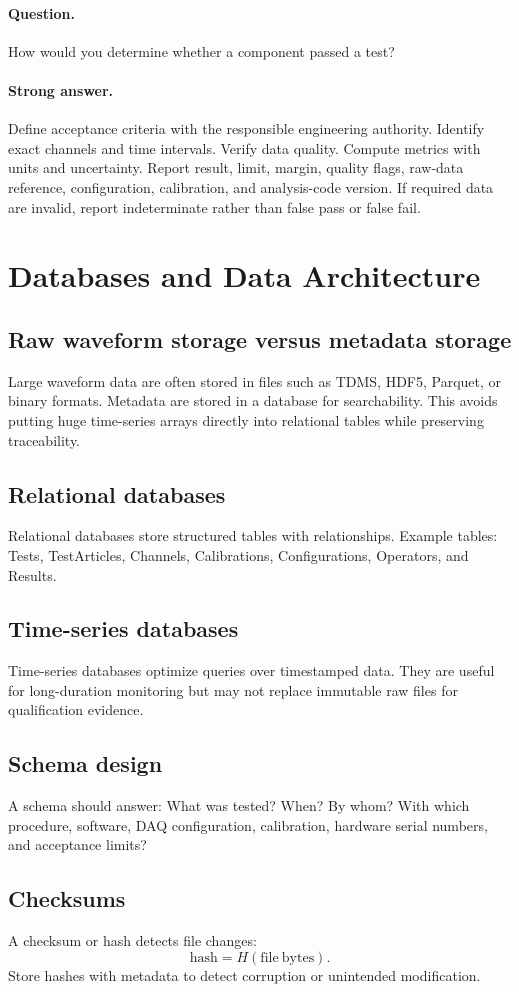 \documentclass[11pt]{article}
\newcommand{\question}[1]{\paragraph{Question.} #1}
\newcommand{\stronganswer}[1]{\paragraph{Strong answer.} #1}
\begin{document}
\question{How would you determine whether a component passed a test?}
\stronganswer{Define acceptance criteria with the responsible engineering
authority. Identify exact channels and time intervals. Verify data quality.
Compute metrics with units and uncertainty. Report result, limit, margin,
quality flags, raw-data reference, configuration, calibration, and analysis-code
version. If required data are invalid, report indeterminate rather than false
pass or false fail.}

\section{Databases and Data Architecture}

\subsection{Raw waveform storage versus metadata storage}
Large waveform data are often stored in files such as TDMS, HDF5, Parquet, or
binary formats. Metadata are stored in a database for searchability. This avoids
putting huge time-series arrays directly into relational tables while preserving
traceability.

\subsection{Relational databases}
Relational databases store structured tables with relationships. Example tables:
Tests, TestArticles, Channels, Calibrations, Configurations, Operators, and
Results.

\subsection{Time-series databases}
Time-series databases optimize queries over timestamped data. They are useful
for long-duration monitoring but may not replace immutable raw files for
qualification evidence.

\subsection{Schema design}
A schema should answer: What was tested? When? By whom? With which procedure,
software, DAQ configuration, calibration, hardware serial numbers, and
acceptance limits?

\subsection{Checksums}
A checksum or hash detects file changes:
\[
\mathrm{hash} = H(\mathrm{file~bytes}).
\]
Store hashes with metadata to detect corruption or unintended modification.
\end{document}
